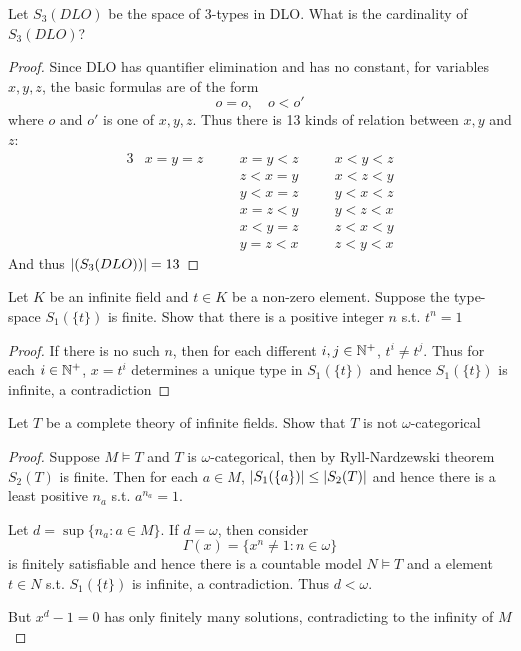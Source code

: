 \documentclass[11pt]{article}
\begin{document}
\begin{exercise}
Let \(S_3(DLO)\) be the space of 3-types in DLO. What is the cardinality of \(S_3(DLO)\)?
\end{exercise}

\begin{proof}
Since DLO has quantifier elimination and has no constant, for variables \(x,y,z\), the basic
formulas are of the form
\begin{equation*}
o=o,\quad o<o'
\end{equation*}
where \(o\) and \(o'\) is one of \(x,y,z\). Thus there is 13 kinds of relation between \(x,y\)
and \(z\):
\begin{alignat*}{3}
&x=y=z\quad&&x=y<z\quad&&x<y<z\\
&&&z<x=y&&x<z<y\\
&&&y<x=z&&y<x<z\\
&&&x=z<y&&y<z<x\\
&&&x<y=z&&z<x<y\\
&&&y=z<x&&z<y<x
\end{alignat*}
And thus \(\abs{(S_3(DLO))}=13\)
\end{proof}

\begin{exercise}
Let \(K\) be an infinite field and \(t\in K\) be a non-zero element. Suppose the
type-space \(S_1(\{t\})\) is finite. Show that there is a positive integer \(n\) s.t. \(t^n=1\)
\end{exercise}

\begin{proof}
If there is no such \(n\), then for each different \(i,j\in\mathbb{N}^+\), \(t^i\neq t^j\). Thus for
each \(i\in\mathbb{N}^+\), \(x=t^i\) determines a unique type in \(S_1(\{t\})\) and hence \(S_1(\{t\})\) is infinite, a contradiction
\end{proof}

\begin{exercise}
Let \(T\) be a complete theory of infinite fields. Show that \(T\) is not \(\omega\)-categorical
\end{exercise}

\begin{proof}
Suppose \(M\vDash T\) and  \(T\) is \(\omega\)-categorical, then by
Ryll-Nardzewski theorem \(S_2(T)\) is finite.
Then for each \(a\in M\), \(\abs{S_1(\{a\})}\le\abs{S_2(T)}\) and hence there is a least positive \(n_a\)
s.t. \(a^{n_a}=1\).

Let \(d=\sup\{n_a:a\in M\}\). If \(d=\omega\), then consider
\begin{equation*}
\Gamma(x)=\{x^n\neq 1:n\in\omega\}
\end{equation*}
is finitely satisfiable and hence there is a countable model \(N\vDash T\) and a element \(t\in N\)
s.t. \(S_1(\{t\})\) is infinite, a contradiction. Thus \(d<\omega\).

But \(x^d-1=0\) has only finitely many solutions, contradicting to the infinity of \(M\)
\end{proof}
\end{document}
